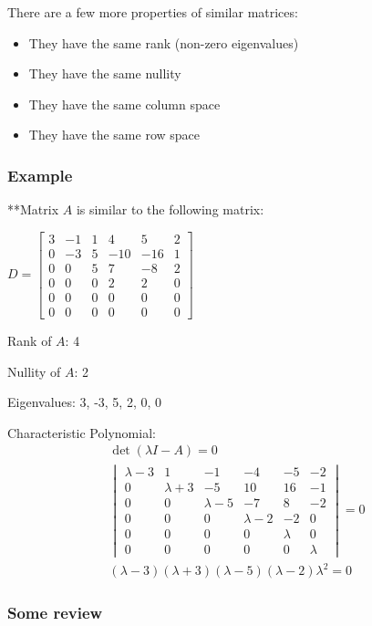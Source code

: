 \documentclass[
  letterpaper,
  DIV=11,
  numbers=noendperiod]{scrartcl}
\providecommand{\tightlist}{%
  \setlength{\itemsep}{0pt}\setlength{\parskip}{0pt}}\usepackage{longtable,booktabs,array}
\begin{document}
There are a few more properties of similar matrices:

\begin{itemize}
\tightlist
\item
  They have the same rank (non-zero eigenvalues)
\item
  They have the same nullity
\item
  They have the same column space
\item
  They have the same row space
\end{itemize}

\subsubsection{Example}\label{example-3}

**Matrix \(A\) is similar to the following matrix:

\(D = \begin{bmatrix}3 & -1 & 1 & 4 & 5 & 2 \\ 0 & -3 & 5 & -10 & -16 & 1 \\ 0 & 0 & 5 & 7 & -8 & 2 \\ 0 & 0 & 0 & 2 & 2 & 0 \\ 0 & 0 & 0 & 0 & 0 & 0 \\ 0 & 0 & 0 & 0 & 0 & 0\end{bmatrix}\)

Rank of \(A\): 4

Nullity of \(A\): 2

Eigenvalues: 3, -3, 5, 2, 0, 0

Characteristic Polynomial: \begin{align*}
\det(\lambda I - A) = 0 \\
\begin{vmatrix}\lambda-3 & 1 & -1 & -4 & -5 & -2 \\ 0 & \lambda+3 & -5 & 10 & 16 & -1 \\ 0 & 0 & \lambda-5 & -7 & 8 & -2 \\ 0 & 0 & 0 & \lambda-2 & -2 & 0 \\ 0 & 0 & 0 & 0 & \lambda & 0 \\ 0 & 0 & 0 & 0 & 0 & \lambda\end{vmatrix} = 0 \\
(\lambda-3)(\lambda+3)(\lambda-5)(\lambda-2)\lambda^2 = 0
\end{align*}

\newpage{}

\subsubsection{Some review}\label{some-review}
\end{document}
